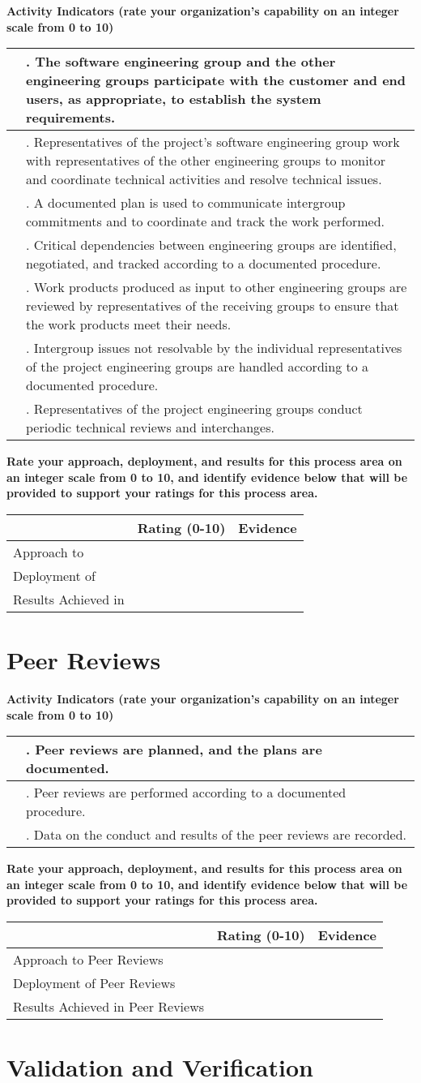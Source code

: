 \documentclass{article}
\renewcommand{\thesection}
{
    KPA.
    \ifnum \value{section}<10 0\fi
    \arabic{section}
}
\newcommand{\KPAname}{}
\let\KPAsection=\section
\renewcommand{\section}[1]{\renewcommand{\KPAname}{#1}\KPAsection{#1}}
\newcounter{activity}		%
\newenvironment{KPAActivity}
{
    \setcounter{activity}{0} %
    {\bf Activity Indicators (rate your organization's capability
    on an integer scale from 0 to 10)} %
    \begin{center}
    \begin{tabular}{|p{0.5in}|p{6.0in}|} \hline %
}
{
    \end{tabular}
    \end{center}
}
\newcommand{\Activity}[2]
{
    \stepcounter{activity} #1 & \arabic{activity}. #2 \\ \hline
} %
\newenvironment{KPARate}
{
    {\bf Rate your approach, deployment, and results for
    this process area on an integer scale from 0 to 10, and 
    identify evidence below that will be provided to support your
    ratings for this process area.}
    \begin{center}
    \begin{tabular}{|p{1.0in}|p{0.5in}|p{5.0in}|} \hline
    & Rating (0-10) & \multicolumn{1}{c|}{Evidence} \\ \hline
}
{
    \end{tabular}
    \end{center}
}
\newcommand{\Approach}[2]{Approach to \KPAname & #1 & #2 \\ \hline}
\newcommand{\Deployment}[2]{Deployment of \KPAname & #1 & #2 \\ \hline}
\newcommand{\Results}[2]{Results Achieved in \KPAname & #1 & #2 \\
	\hline}
\begin{document}
\begin{KPAActivity}
\Activity{}{The software engineering group and the other engineering
groups participate with the customer and end users, as appropriate, to
establish the system requirements.}
\Activity{}{Representatives of the project's software engineering
group work with representatives of the other engineering groups to
monitor and coordinate technical activities and resolve technical
issues.}
\Activity{}{A documented plan is used to communicate intergroup
commitments and to coordinate and track the work performed.}
\Activity{}{Critical dependencies between engineering groups are
identified, negotiated, and tracked according to a documented
procedure.}
\Activity{}{Work products produced as input to other engineering groups
are reviewed by representatives of the receiving groups to ensure that
the work products meet their needs.}
\Activity{}{Intergroup issues not resolvable by the individual
representatives of the project engineering groups are handled
according to a documented procedure.}
\Activity{}{Representatives of the project engineering groups conduct
periodic technical reviews and interchanges.}
\end{KPAActivity}

\begin{KPARate}
\Approach{}{}
\Deployment{}{}
\Results{}{}
\end{KPARate}

\newpage
\section{Peer Reviews}

\begin{KPAActivity}
\Activity{}{Peer reviews are planned, and the plans are documented.}
\Activity{}{Peer reviews are performed according to a documented
procedure.}
\Activity{}{Data on the conduct and results of the peer reviews are
recorded.} 
\end{KPAActivity}

\begin{KPARate}
\Approach{}{}
\Deployment{}{}
\Results{}{}
\end{KPARate}

\newpage
\renewcommand{\thesection}{ASCI KPA}
\section{Validation and Verification}
\end{document}
